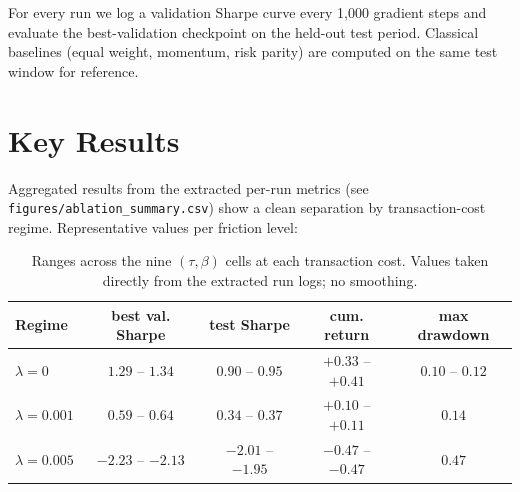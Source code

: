 For every run we log a validation Sharpe curve every 1{,}000 gradient
steps and evaluate the best-validation checkpoint on the held-out test
period.  Classical baselines (equal weight, momentum, risk parity) are
computed on the same test window for reference.

\section{Key Results}

Aggregated results from the extracted per-run metrics (see
\texttt{figures/ablation\_summary.csv}) show a clean separation by
transaction-cost regime.  Representative values per friction level:
\vspace{-10pt}
\begin{table}[h]
\centering
\small
\begin{tabular}{lcccc}
\toprule
Regime & best val. Sharpe & test Sharpe & cum. return & max drawdown \\
\midrule
$\lambda = 0$     & $1.29$ -- $1.34$  & $0.90$ -- $0.95$   & $+0.33$ -- $+0.41$ & $0.10$ -- $0.12$ \\
$\lambda = 0.001$ & $0.59$ -- $0.64$  & $0.34$ -- $0.37$   & $+0.10$ -- $+0.11$ & $0.14$ \\
$\lambda = 0.005$ & $-2.23$ -- $-2.13$ & $-2.01$ -- $-1.95$ & $-0.47$ -- $-0.47$ & $0.47$ \\
\bottomrule
\end{tabular}
\vspace{-10pt}
\caption{Ranges across the nine $(\tau,\beta)$ cells at each transaction
cost. Values taken directly from the extracted run logs; no smoothing.}
\label{tab:by-tc}
\end{table}
\vspace{-13pt}

